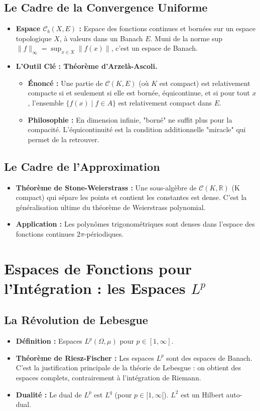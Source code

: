 \documentclass[12pt, a4paper, parskip=full]{report}
\theoremstyle{agregstyle}
\begin{document}
\subsection{Le Cadre de la Convergence Uniforme}
\begin{itemize}
    \item \textbf{Espace $\mathcal{C}_b(X, E)$ :} Espace des fonctions continues et bornées sur un espace topologique $X$, à valeurs dans un Banach $E$. Muni de la norme sup $\|f\|_\infty = \sup_{x \in X} \|f(x)\|$, c'est un espace de Banach.
    \item \textbf{L'Outil Clé : Théorème d'Arzelà-Ascoli.}
        \begin{itemize}
            \item \textbf{Énoncé :} Une partie de $\mathcal{C}(K, E)$ (où $K$ est compact) est relativement compacte si et seulement si elle est bornée, équicontinue, et si pour tout $x$, l'ensemble $\{f(x) \mid f \in A\}$ est relativement compact dans $E$.
            \item \textbf{Philosophie :} En dimension infinie, "borné" ne suffit plus pour la compacité. L'équicontinuité est la condition additionnelle "miracle" qui permet de la retrouver.
        \end{itemize}
\end{itemize}
\subsection{Le Cadre de l'Approximation}
\begin{itemize}
    \item \textbf{Théorème de Stone-Weierstrass :} Une sous-algèbre de $\mathcal{C}(K, \mathbb{R})$ (K compact) qui sépare les points et contient les constantes est dense. C'est la généralisation ultime du théorème de Weierstrass polynomial.
    \item \textbf{Application :} Les polynômes trigonométriques sont denses dans l'espace des fonctions continues $2\pi$-périodiques.
\end{itemize}

\section{Espaces de Fonctions pour l'Intégration : les Espaces $L^p$}
\subsection{La Révolution de Lebesgue}
\begin{itemize}
    \item \textbf{Définition :} Espaces $L^p(\Omega, \mu)$ pour $p \in [1, \infty]$.
    \item \textbf{Théorème de Riesz-Fischer :} Les espaces $L^p$ sont des espaces de Banach. C'est la justification principale de la théorie de Lebesgue : on obtient des espaces complets, contrairement à l'intégration de Riemann.
    \item \textbf{Dualité :} Le dual de $L^p$ est $L^q$ (pour $p \in [1, \infty[$). $L^2$ est un Hilbert auto-dual.
\end{itemize}
\end{document}
